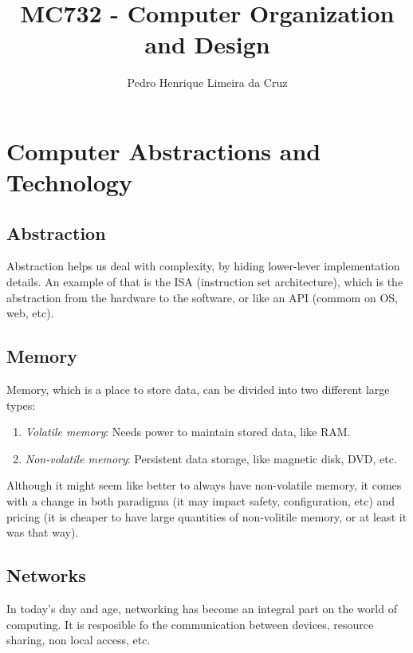 \documentclass{article}
\author{Pedro Henrique Limeira da Cruz}
\title{MC732 - Computer Organization and Design}
\begin{document}
\maketitle
\thispagestyle{empty}


\newpage
\tableofcontents
\newpage

\section{Computer Abstractions and Technology}
\subsection{Abstraction}
Abstraction helps us deal with complexity, by hiding lower-lever implementation details. An example of that is the ISA (instruction set architecture), which is the abstraction from the hardware to the software, or like an API (commom on OS, web, etc).

\subsection{Memory}
Memory, which is a place to store data, can be divided into two different large types:
\begin{enumerate}
    \item \emph{Volatile memory}: Needs power to maintain stored data, like RAM.
    \item \emph{Non-volatile memory}: Persistent data storage, like magnetic disk, DVD, etc.
\end{enumerate}

Although it might seem like better to always have non-volatile memory, it comes with a change in both paradigma (it may impact safety, configuration, etc) and pricing (it is cheaper to have large quantities of non-volitile memory, or at least it was that way).

\subsection{Networks}
In today's day and age, networking has become an integral part on the world of computing. It is resposible fo the communication between devices, resource sharing, non local access, etc.
\end{document}
